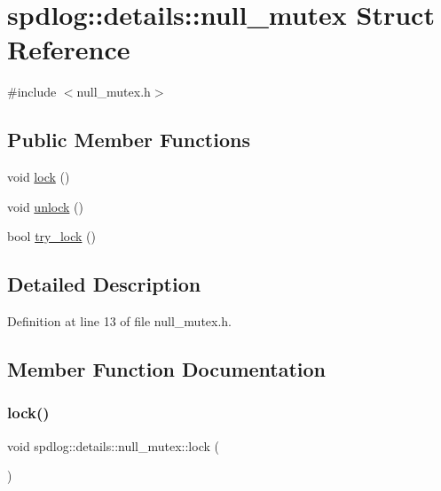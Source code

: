 \hypertarget{structspdlog_1_1details_1_1null__mutex}{}\section{spdlog\+:\+:details\+:\+:null\+\_\+mutex Struct Reference}
\label{structspdlog_1_1details_1_1null__mutex}


{\ttfamily \#include $<$null\+\_\+mutex.\+h$>$}

\subsection*{Public Member Functions}
\begin{DoxyCompactItemize}
\item 
void \hyperlink{structspdlog_1_1details_1_1null__mutex_acaccd5741a4d60756a2c23018f670b9a}{lock} ()
\item 
void \hyperlink{structspdlog_1_1details_1_1null__mutex_acbc27862ec43b4b0e9c8f5197174f95f}{unlock} ()
\item 
bool \hyperlink{structspdlog_1_1details_1_1null__mutex_a1e367b1adaa6305edbe163c4d2021c53}{try\+\_\+lock} ()
\end{DoxyCompactItemize}


\subsection{Detailed Description}


Definition at line 13 of file null\+\_\+mutex.\+h.



\subsection{Member Function Documentation}
\mbox{\label{structspdlog_1_1details_1_1null__mutex_acaccd5741a4d60756a2c23018f670b9a}} 
\subsubsection{\texorpdfstring{lock()}{lock()}}
{\footnotesize\ttfamily void spdlog\+::details\+::null\+\_\+mutex\+::lock (\begin{DoxyParamCaption}{ }\end{DoxyParamCaption})\hspace{0.3cm}{\ttfamily [inline]}}



